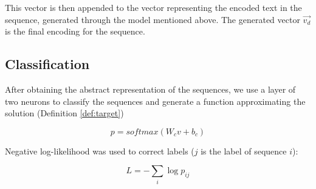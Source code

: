 This vector is then appended to the vector representing the encoded text in the sequence, 
generated through the model mentioned above. 
The generated vector $\vec{v_d}$ is the final encoding for the sequence.


\subsection{Classification}
After obtaining the abstract representation of the sequences, 
we use a layer of two neurons to classify the sequences and 
generate a function approximating the solution (Definition \ref{def:target}) 

\begin{equation*}
	p = softmax(W_c v + b_c)
\end{equation*}

Negative log-likelihood was used to correct labels ($j$ is the label of sequence $i$): 

\begin{equation*}
	L = - \sum_{i} \log{p_{ij}}
\end{equation*}


